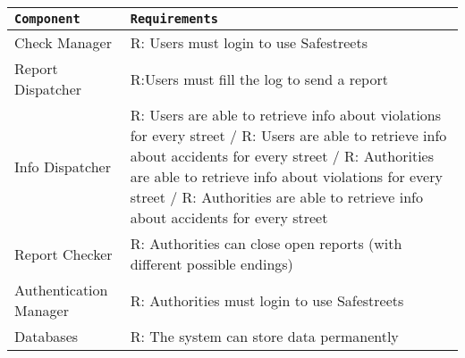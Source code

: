 \begin{tabular}{|l|l|}
    
    \texttt{Component} & \texttt{Requirements} \\ \hline

    Check Manager & R: Users must login to use Safestreets \\ \hline
    Report Dispatcher & R:Users must fill the log to send a report \\ \hline
    Info Dispatcher & %
                            R: Users are able to retrieve info about violations for every street
                            / R: Users are able to retrieve info about accidents for every street
                            / R: Authorities are able to retrieve info about violations for every street
                            / R: Authorities are able to retrieve info about accidents for every street
                        \\ \hline
    Report Checker & R: Authorities can close open reports (with different possible endings)\\ \hline
    Authentication Manager & R: Authorities must login to use Safestreets\\ \hline
    Databases & R: The system can store data permanently \\ \hline
    
\end{tabular}